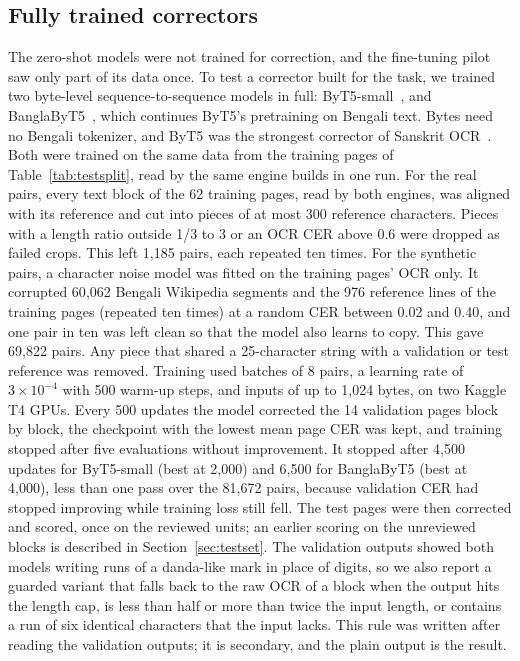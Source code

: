 \documentclass[conference]{IEEEtran}
\begin{document}
\subsection{Fully trained correctors}
\label{sec:trained}
The zero-shot models were not trained for correction, and the fine-tuning pilot saw only part of its data once. To test a corrector built for the task, we trained two byte-level sequence-to-sequence models in full: ByT5-small~\cite{xue2022byt5}, and BanglaByT5~\cite{bhattacharyya2025banglabyt5}, which continues ByT5's pretraining on Bengali text. Bytes need no Bengali tokenizer, and ByT5 was the strongest corrector of Sanskrit OCR~\cite{maheshwari2022sanskrit}. Both were trained on the same data from the training pages of Table~\ref{tab:testsplit}, read by the same engine builds in one run. For the real pairs, every text block of the 62 training pages, read by both engines, was aligned with its reference and cut into pieces of at most 300 reference characters. Pieces with a length ratio outside 1/3 to 3 or an OCR CER above 0.6 were dropped as failed crops. This left 1{,}185 pairs, each repeated ten times. For the synthetic pairs, a character noise model was fitted on the training pages' OCR only. It corrupted 60{,}062 Bengali Wikipedia segments and the 976 reference lines of the training pages (repeated ten times) at a random CER between 0.02 and 0.40, and one pair in ten was left clean so that the model also learns to copy. This gave 69{,}822 pairs. Any piece that shared a 25-character string with a validation or test reference was removed. Training used batches of 8 pairs, a learning rate of $3\times10^{-4}$ with 500 warm-up steps, and inputs of up to 1{,}024 bytes, on two Kaggle T4 GPUs. Every 500 updates the model corrected the 14 validation pages block by block, the checkpoint with the lowest mean page CER was kept, and training stopped after five evaluations without improvement. It stopped after 4{,}500 updates for ByT5-small (best at 2{,}000) and 6{,}500 for BanglaByT5 (best at 4{,}000), less than one pass over the 81{,}672 pairs, because validation CER had stopped improving while training loss still fell. The test pages were then corrected and scored, once on the reviewed units; an earlier scoring on the unreviewed blocks is described in Section~\ref{sec:testset}. The validation outputs showed both models writing runs of a danda-like mark in place of digits, so we also report a guarded variant that falls back to the raw OCR of a block when the output hits the length cap, is less than half or more than twice the input length, or contains a run of six identical characters that the input lacks. This rule was written after reading the validation outputs; it is secondary, and the plain output is the result.
\end{document}
